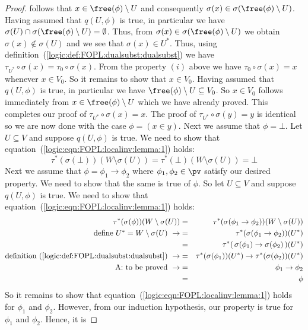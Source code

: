 \begin{proof}
follows that $x\in\free(\phi)\setminus U$ and consequently
$\sigma(x)\in\sigma(\free(\phi)\setminus U)$. Having assumed that
$q(U,\phi)$ is true, in particular we have
$\sigma(U)\cap\sigma(\free(\phi)\setminus U)=\emptyset$. Thus, from
$\sigma(x)\in\sigma(\free(\phi)\setminus U)$ we obtain
$\sigma(x)\not\in\sigma(U)$ and we see that $\sigma(x)\in U^{*}$.
Thus, using definition~(\ref{logic:def:FOPL:dualsubst:dualsubst}) we
have $\tau_{U^{*}}\circ\sigma(x)=\tau_{0}\circ\sigma(x)$. From the
property $(i)$ above we have $\tau_{0}\circ\sigma(x)=x$ whenever
$x\in V_{0}$. So it remains to show that $x\in V_{0}$. Having
assumed that $q(U,\phi)$ is true, in particular we have
$\free(\phi)\setminus U\subseteq V_{0}$. So $x\in V_{0}$ follows
immediately from $x\in\free(\phi)\setminus U$ which we have already
proved. This completes our proof of $\tau_{U^{*}}\circ\sigma(x)=x$.
The proof of $\tau_{U^{*}}\circ\sigma(y)=y$ is identical so we are
now done with the case $\phi=(x\in y)$. Next we assume that
$\phi=\bot$. Let $U\subseteq V$ and suppose $q(U,\phi)$ is true. We
need to show that equation~(\ref{logic:eqn:FOPL:localinv:lemma:1})
holds:
    \[
    \tau^{*}(\sigma(\bot))(W\setminus\sigma(U))
    =\tau^{*}(\bot)(W\setminus\sigma(U))=\bot
    \]
Next we assume that $\phi=\phi_{1}\to\phi_{2}$ where
$\phi_{1},\phi_{2}\in\pv$ satisfy our desired property. We need to
show that the same is true of $\phi$. So let $U\subseteq V$ and
suppose $q(U,\phi)$ is true. We need to show that
equation~(\ref{logic:eqn:FOPL:localinv:lemma:1}) holds:
    \begin{eqnarray*}
    \tau^{*}(\sigma(\phi))(W\setminus\sigma(U))&=&
    \tau^{*}(\sigma(\phi_{1}\to\phi_{2}))(W\setminus\sigma(U))\\
    \mbox{define $U^{*}=W\setminus\sigma(U)$}\ \rightarrow
    &=&\tau^{*}(\sigma(\phi_{1}\to\phi_{2}))(U^{*})\\
    &=&\tau^{*}(\,\sigma(\phi_{1})\to\sigma(\phi_{2})\,)(U^{*})\\
    \mbox{definition~(\ref{logic:def:FOPL:dualsubst:dualsubst})}\
    \rightarrow
    &=&\tau^{*}(\sigma(\phi_{1}))(U^{*})\to\tau^{*}(\sigma(\phi_{2}))(U^{*})\\
    \mbox{A: to be proved}\ \rightarrow&=&\phi_{1}\to\phi_{2}\\
    &=&\phi
    \end{eqnarray*}
So it remains to show that
equation~(\ref{logic:eqn:FOPL:localinv:lemma:1}) holds for
$\phi_{1}$ and $\phi_{2}$. However, from our induction hypothesis,
our property is true for $\phi_{1}$ and $\phi_{2}$. Hence, it is

\end{proof}
